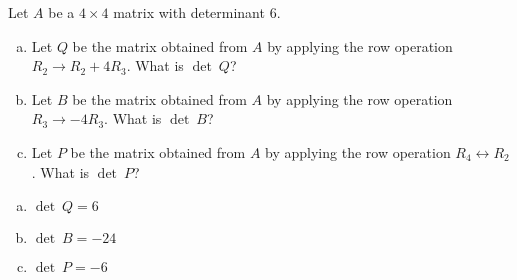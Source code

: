 
\begin{exerciseStatement}


Let \(A\) be a \(4 \times 4\) matrix with determinant \( 6 \).


\begin{enumerate}[(a)]
\item Let \(Q\) be the matrix obtained from \(A\) by applying the row operation \( R_2 \to R_2 + 4R_3 \). What is \(\operatorname{det}\ Q\)?
\item Let \(B\) be the matrix obtained from \(A\) by applying the row operation \( R_3 \to -4R_3 \). What is \(\operatorname{det}\ B\)?
\item Let \(P\) be the matrix obtained from \(A\) by applying the row operation \( R_4 \leftrightarrow R_2 \). What is \(\operatorname{det}\ P\)?
\end{enumerate}
    
\end{exerciseStatement}
    
\begin{exerciseAnswer} 

\begin{enumerate}[(a)]
\item \(\operatorname{det}\ Q= 6 \)
\item \(\operatorname{det}\ B= -24 \)
\item \(\operatorname{det}\ P= -6 \)
\end{enumerate}
    
\end{exerciseAnswer}
    
